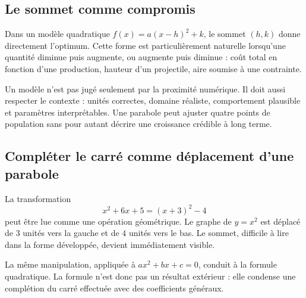 \documentclass[12pt,a4paper,openany]{book}
\begin{document}
\subsection{Le sommet comme compromis}
Dans un modèle quadratique $f(x)=a(x-h)^2+k$, le sommet $(h,k)$ donne directement l'optimum. Cette forme est particulièrement naturelle lorsqu'une quantité diminue puis augmente, ou augmente puis diminue : coût total en fonction d'une production, hauteur d'un projectile, aire soumise à une contrainte.

\begin{connectionbox}
Un modèle n'est pas jugé seulement par la proximité numérique. Il doit aussi respecter le contexte : unités correctes, domaine réaliste, comportement plausible et paramètres interprétables. Une parabole peut ajuster quatre points de population sans pour autant décrire une croissance crédible à long terme.
\end{connectionbox}



\subsection{Compléter le carré comme déplacement d'une parabole}
La transformation
\[
x^2+6x+5=(x+3)^2-4
\]
peut être lue comme une opération géométrique. Le graphe de $y=x^2$ est déplacé de $3$ unités vers la gauche et de $4$ unités vers le bas. Le sommet, difficile à lire dans la forme développée, devient immédiatement visible.

\begin{center}
\end{center}

La même manipulation, appliquée à $ax^2+bx+c=0$, conduit à la formule quadratique. La formule n'est donc pas un résultat extérieur : elle condense une complétion du carré effectuée avec des coefficients généraux.
\end{document}
